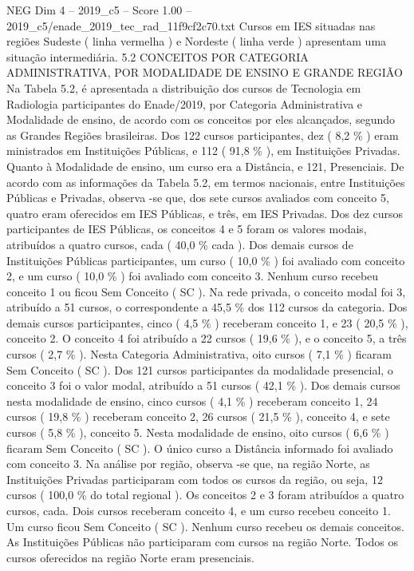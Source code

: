 \begin{textsample}{NEG Dim 4 – 2019\_c5 – Score 1.00 – 2019\_c5/enade\_2019\_tec\_rad\_11f9cf2c70.txt}
Cursos em IES situadas nas regiões Sudeste ( linha vermelha ) e Nordeste ( linha verde ) apresentam uma situação intermediária. 5.2 CONCEITOS POR CATEGORIA ADMINISTRATIVA, POR MODALIDADE DE ENSINO E GRANDE REGIÃO Na Tabela 5.2, é apresentada a distribuição dos cursos de Tecnologia em Radiologia participantes do Enade/2019, por Categoria Administrativa e Modalidade de ensino, de acordo com os conceitos por eles alcançados, segundo as Grandes Regiões brasileiras.
Dos 122 cursos participantes, dez ( 8,2 \% ) eram ministrados em Instituições Públicas, e 112 ( 91,8 \% ), em Instituições Privadas.
Quanto à Modalidade de ensino, um curso era a Distância, e 121, Presenciais.
De acordo com as informações da Tabela 5.2, em termos nacionais, entre Instituições Públicas e Privadas, observa -se que, dos sete cursos avaliados com conceito 5, quatro eram oferecidos em IES Públicas, e três, em IES Privadas.
Dos dez cursos participantes de IES Públicas, os conceitos 4 e 5 foram os valores modais, atribuídos a quatro cursos, cada ( 40,0 \% cada ).
Dos demais cursos de Instituições Públicas participantes, um curso ( 10,0 \% ) foi avaliado com conceito 2, e um curso ( 10,0 \% ) foi avaliado com conceito 3.
Nenhum curso recebeu conceito 1 ou ficou Sem Conceito ( SC ).
Na rede privada, o conceito modal foi 3, atribuído a 51 cursos, o correspondente a 45,5 \% dos 112 cursos da categoria.
Dos demais cursos participantes, cinco ( 4,5 \% ) receberam conceito 1, e 23 ( 20,5 \% ), conceito 2.
O conceito 4 foi atribuído a 22 cursos ( 19,6 \% ), e o conceito 5, a três cursos ( 2,7 \% ).
Nesta Categoria Administrativa, oito cursos ( 7,1 \% ) ficaram Sem Conceito ( SC ).
Dos 121 cursos participantes da modalidade presencial, o conceito 3 foi o valor modal, atribuído a 51 cursos ( 42,1 \% ).
Dos demais cursos nesta modalidade de ensino, cinco cursos ( 4,1 \% ) receberam conceito 1, 24 cursos ( 19,8 \% ) receberam conceito 2, 26 cursos ( 21,5 \% ), conceito 4, e sete cursos ( 5,8 \% ), conceito 5.
Nesta modalidade de ensino, oito cursos ( 6,6 \% ) ficaram Sem Conceito ( SC ).
O único curso a Distância informado foi avaliado com conceito 3.
Na análise por região, observa -se que, na região Norte, as Instituições Privadas participaram com todos os cursos da região, ou seja, 12 cursos ( 100,0 \% do total regional ).
Os conceitos 2 e 3 foram atribuídos a quatro cursos, cada.
Dois cursos receberam conceito 4, e um curso recebeu conceito 1.
Um curso ficou Sem Conceito ( SC ).
Nenhum curso recebeu os demais conceitos.
As Instituições Públicas não participaram com cursos na região Norte.
Todos os cursos oferecidos na região Norte eram presenciais.

\end{textsample}
